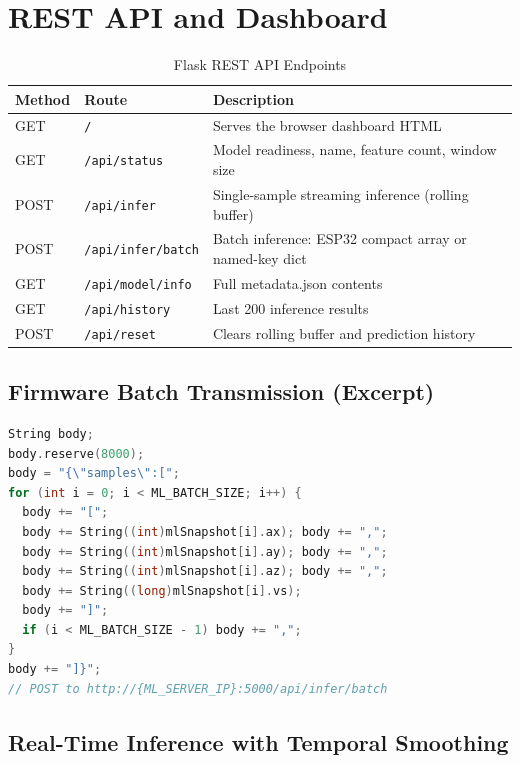 \documentclass[12pt,a4paper]{report}
\begin{document}
\section{REST API and Dashboard}

\begin{table}[H]
  \centering
  \caption{Flask REST API Endpoints}
  \label{tab:api}
  \begin{tabular}{llp{7cm}}
    \toprule
    \textbf{Method} & \textbf{Route} & \textbf{Description} \\
    \midrule
    GET  & \texttt{/}                & Serves the browser dashboard HTML \\
    GET  & \texttt{/api/status}      & Model readiness, name, feature count, window size \\
    POST & \texttt{/api/infer}       & Single-sample streaming inference (rolling buffer) \\
    POST & \texttt{/api/infer/batch} & Batch inference: ESP32 compact array or named-key dict \\
    GET  & \texttt{/api/model/info}  & Full metadata.json contents \\
    GET  & \texttt{/api/history}     & Last 200 inference results \\
    POST & \texttt{/api/reset}       & Clears rolling buffer and prediction history \\
    \bottomrule
  \end{tabular}
\end{table}

\subsection{Firmware Batch Transmission (Excerpt)}

\begin{lstlisting}[language=C++, caption={ESP32 batch JSON serialisation (gvms\_final.ino)}, label={lst:esp}]
String body;
body.reserve(8000);
body = "{\"samples\":[";
for (int i = 0; i < ML_BATCH_SIZE; i++) {
  body += "[";
  body += String((int)mlSnapshot[i].ax); body += ",";
  body += String((int)mlSnapshot[i].ay); body += ",";
  body += String((int)mlSnapshot[i].az); body += ",";
  body += String((long)mlSnapshot[i].vs);
  body += "]";
  if (i < ML_BATCH_SIZE - 1) body += ",";
}
body += "]}";
// POST to http://{ML_SERVER_IP}:5000/api/infer/batch
\end{lstlisting}

\subsection{Real-Time Inference with Temporal Smoothing}
\end{document}
